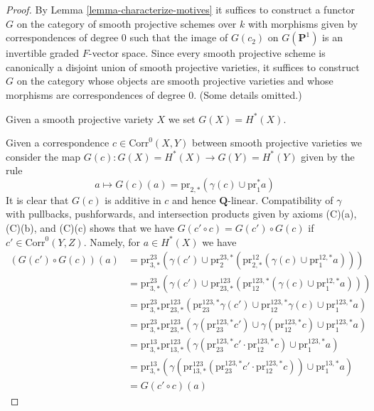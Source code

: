 \documentclass{stacks-project}
\theoremstyle{plain}
\theoremstyle{definition}
\theoremstyle{remark}
\numberwithin{equation}{subsection}
\begin{document}
\begin{proof}
By Lemma \ref{lemma-characterize-motives} it suffices to construct a functor
$G$ on the category of smooth projective schemes over $k$
with morphisms given by correspondences of degree $0$ such that
the image of $G(c_2)$ on $G(\mathbf{P}^1)$ is an invertible graded
$F$-vector space.
Since every smooth projective scheme is canonically a disjoint
union of smooth projective varieties, it suffices to construct
$G$ on the category whose objects are smooth projective varieties
and whose morphisms are correspondences of degree $0$. (Some details
omitted.)

\medskip\noindent
Given a smooth projective variety $X$ we set $G(X) = H^*(X)$.

\medskip\noindent
Given a correspondence $c \in \text{Corr}^0(X, Y)$ between smooth
projective varieties we consider the map
$G(c) : G(X) = H^*(X) \to G(Y) = H^*(Y)$ given by the rule
$$
a \longmapsto
G(c)(a) = \text{pr}_{2, *}(\gamma(c) \cup \text{pr}_1^*a)
$$
It is clear that $G(c)$ is additive in $c$ and hence $\mathbf{Q}$-linear.
Compatibility of $\gamma$ with pullbacks, pushforwards, and
intersection products given by axioms (C)(a), (C)(b), and (C)(c)
shows that we have
$G(c' \circ c) = G(c') \circ G(c)$ if $c' \in \text{Corr}^0(Y, Z)$.
Namely, for $a \in H^*(X)$ we have
\begin{align*}
(G(c') \circ G(c))(a)
& =
\text{pr}^{23}_{3, *}(\gamma(c') \cup
\text{pr}^{23, *}_2(\text{pr}^{12}_{2, *}(\gamma(c) \cup
\text{pr}^{12, *}_1a))) \\
& =
\text{pr}^{23}_{3, *}(\gamma(c') \cup
\text{pr}^{123}_{23, *}(\text{pr}^{123, *}_{12}(\gamma(c) \cup
\text{pr}^{12, *}_1 a))) \\
& =
\text{pr}^{23}_{3, *}
\text{pr}^{123}_{23, *}(
\text{pr}^{123, *}_{23}\gamma(c') \cup
\text{pr}^{123, *}_{12}\gamma(c) \cup
\text{pr}^{123, *}_1 a) \\
& =
\text{pr}^{23}_{3, *}
\text{pr}^{123}_{23, *}(
\gamma(\text{pr}^{123, *}_{23}c') \cup
\gamma(\text{pr}^{123, *}_{12}c) \cup
\text{pr}^{123, *}_1 a) \\
& =
\text{pr}^{13}_{3, *}
\text{pr}^{123}_{13, *}(
\gamma(\text{pr}^{123, *}_{23}c' \cdot \text{pr}^{123, *}_{12}c) \cup
\text{pr}^{123, *}_1 a) \\
& =
\text{pr}^{13}_{3, *}(
\gamma(\text{pr}^{123}_{13, *}(
\text{pr}^{123, *}_{23}c' \cdot \text{pr}^{123, *}_{12}c)) \cup
\text{pr}^{13, *}_1 a) \\
& =
G(c' \circ c)(a)
\end{align*}

\end{proof}
\end{document}
